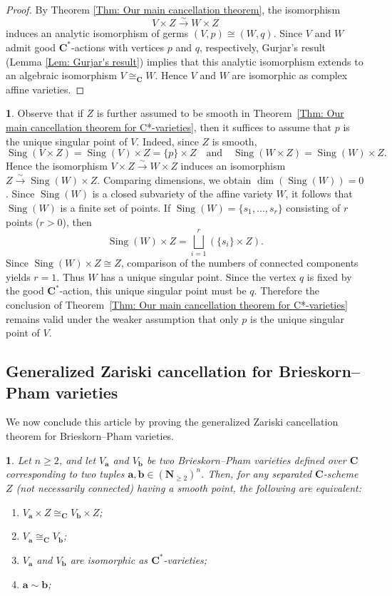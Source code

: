 \documentclass[english,10pt,reqno,twoside]{amsart}
\numberwithin{equation}{section}
\numberwithin{figure}{section}
\theoremstyle{plain}
\newtheorem{thm}{\protect\theoremname}
\theoremstyle{plain}
\theoremstyle{definition}
\newtheorem{rem}{\protect\remarkname}
\providecommand{\theoremname}{Theorem}
\providecommand{\remarkname}{Remark}
\theoremstyle{plain}
\numberwithin{equation}{section}
\newcommand{\C}{\mathbf{C}}
\newcommand{\N}{\mathbf{N}}
\newcommand{\ba}{\mathbf{a}}
\newcommand{\bb}{\mathbf{b}}
\newcommand{\Sing}{\operatorname{Sing}}
\begin{document}
\begin{proof}
By Theorem \ref{Thm: Our main cancellation theorem}, the isomorphism
\[
V\times Z \xrightarrow{\sim} W\times Z
\]
induces an analytic isomorphism of germs $(V,p)\cong (W,q)$. Since $V$ and $W$ admit good $\C^*$-actions with vertices $p$ and $q$, respectively, Gurjar's result (Lemma \ref{Lem: Gurjar's result}) implies that this analytic isomorphism extends to an algebraic isomorphism $V\cong_{\C} W$. Hence $V$ and $W$ are isomorphic as complex affine varieties.
\end{proof}

\begin{rem}
Observe that if $Z$ is further assumed to be smooth in Theorem~\ref{Thm: Our main cancellation theorem for C*-varieties}, then it suffices to assume that $p$ is the unique singular point of $V$. Indeed, since $Z$ is smooth,
\[
\Sing(V\times Z)=\Sing(V)\times Z=\{p\}\times Z
\quad
\text{and}\quad 
\Sing(W\times Z)=\Sing(W)\times Z.
\]
Hence the isomorphism $V\times Z\xrightarrow{\sim} W\times Z$ induces an isomorphism $Z\xrightarrow{\sim} \Sing(W)\times Z$.
Comparing dimensions, we obtain $\dim(\Sing(W))=0$. Since $\Sing(W)$ is a closed subvariety of the affine variety $W$, it follows that $\Sing(W)$ is a finite set of points. If $\Sing(W)=\{s_1,\ldots,s_r\}$ consisting of $r$ points ($r>0$), then
\[
\Sing(W)\times Z=\bigsqcup_{i=1}^{r} \left(\{s_i\}\times Z\right).
\]
Since $\Sing(W)\times Z\cong Z$, comparison of the numbers of connected components yields $r=1$. Thus $W$ has a unique singular point. Since the vertex $q$ is fixed by the good $\C^*$-action, this unique singular point must be $q$. Therefore the conclusion of Theorem~\ref{Thm: Our main cancellation theorem for C*-varieties} remains valid under the weaker assumption that only $p$ is the unique singular point of $V$.
\end{rem}


\subsection{Generalized Zariski cancellation for Brieskorn--Pham varieties}\label{subse3.3}

We now conclude this article by proving the generalized Zariski cancellation theorem for Brieskorn--Pham varieties.

\begin{thm}\label{Thm: Our main cancellation theorem for B-P varieties}
    Let $n\geq 2$, and let $V_\ba$ and $V_\bb$ be two Brieskorn--Pham varieties defined over $\C$ corresponding to two tuples $\ba,\bb\in(\N_{\geq 2})^n$. Then, for any separated $\C$-scheme $Z$ (not necessarily connected) having a smooth point, the following are equivalent:
    \begin{enumerate}[\indent\rm(1)]
        \item $V_\ba\times Z\cong_{\C} V_\bb\times Z$;
        \item $V_\ba\cong_{\C} V_\bb$;
        \item $V_\ba$ and $V_\bb$ are isomorphic as $\C^*$-varieties;
        \item $\ba \sim \bb$;
    \end{enumerate}
\end{thm}
\end{document}
